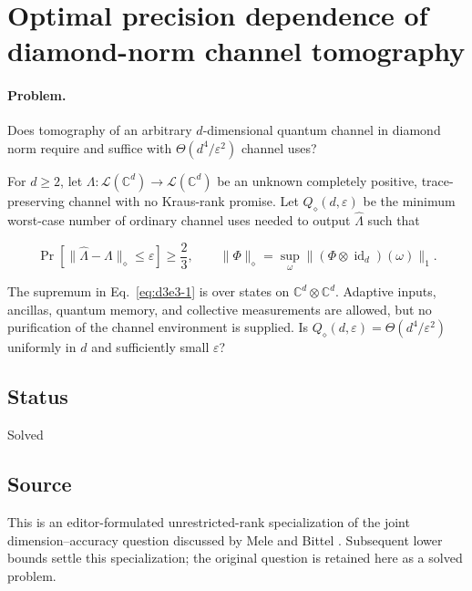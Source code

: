 \section{Optimal precision dependence of diamond-norm channel tomography}
\label{sec:op_d3e38bc5b5b35af3}

\paragraph{Problem.}
Does tomography of an arbitrary $d$-dimensional quantum channel in diamond norm require and suffice with $\Theta(d^4/\varepsilon^2)$ channel uses?

For $d\geq2$, let $\Lambda:\mathcal L(\mathbb C^d)\to\mathcal L(\mathbb C^d)$ be an unknown completely positive, trace-preserving channel with no Kraus-rank promise. Let $Q_\diamond(d,\varepsilon)$ be the minimum worst-case number of ordinary channel uses needed to output $\widehat\Lambda$ such that

\begin{equation}
\Pr[\|\widehat\Lambda-\Lambda\|_\diamond\leq\varepsilon]\geq\frac23,
\qquad
\|\Phi\|_\diamond=\sup_\omega\| (\Phi\otimes\operatorname{id}_d)(\omega)\|_1.
\label{eq:d3e3-1}
\end{equation}

The supremum in Eq.~\eqref{eq:d3e3-1} is over states on $\mathbb C^d\otimes\mathbb C^d$. Adaptive inputs, ancillas, quantum memory, and collective measurements are allowed, but no purification of the channel environment is supplied. Is $Q_\diamond(d,\varepsilon)=\Theta(d^4/\varepsilon^2)$ uniformly in $d$ and sufficiently small $\varepsilon$?

\subsection*{Status}

Solved

\subsection*{Source}

This is an editor-formulated unrestricted-rank specialization of the joint dimension--accuracy question discussed by Mele and Bittel . Subsequent lower bounds settle this specialization; the original question is retained here as a solved problem.


